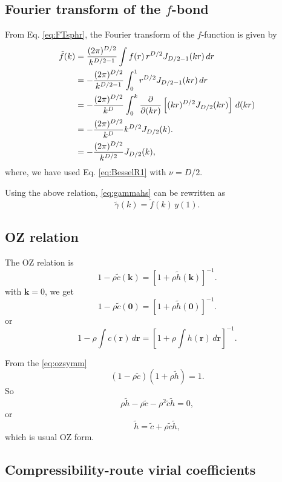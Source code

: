 \documentclass[preprint]{revtex4-1}
\numberwithin{equation}{subsection}
\numberwithin{table}{section}
\newcommand{\vct}[1]{\mathbf{#1}}
\providecommand{\vr}{} %
\renewcommand{\vr}{\vct{r}}
\newcommand{\vk}{\vct{k}}
\begin{document}
\subsection{Fourier transform of the $f$-bond}

From Eq. \eqref{eq:FTsphr},
the Fourier transform of the $f$-function is given by
\begin{align}
  \tilde{f}(k)
&=
\frac{(2\pi)^{D/2}}{k^{D/2-1}}
\int f(r) \, r^{D/2} J_{D/2-1}(kr) \, dr
\notag \\
&=
-\frac{(2\pi)^{D/2}}{k^{D/2-1}}
\int_0^1 r^{D/2} J_{D/2-1}(kr) \, dr
\notag \\
&=
-\frac{(2\pi)^{D/2}}{k^{D}}
\int_0^k \frac{\partial}{\partial (kr)}
\left[(kr)^{D/2} J_{D/2}(kr) \right] \, d(kr)
\notag \\
&=
-\frac{(2\pi)^{D/2}}{k^{D}}
k^{D/2} J_{D/2}(k).
\notag \\
&=
-\frac{(2\pi)^{D/2}}{k^{D/2}} J_{D/2}(k),
\end{align}
where, we have used Eq. \eqref{eq:BesselR1}
with $\nu = D/2$.


Using the above relation, \eqref{eq:gammahs}
can be rewritten as
\[
  \tilde{\gamma}(k) = \tilde{f}(k) \, y(1).
\]




\subsection{OZ relation}

The OZ relation is
\begin{equation}
  1 - \rho \tilde c(\vk)
=
 [1 + \rho \tilde h(\vk)]^{-1}.
 \label{eq:ozsymm}
\end{equation}
%
with $\vk = 0$, we get
\[
  1 - \rho \tilde c(\vct 0)
=
 [1 + \rho \tilde h(\vct 0)]^{-1}.
\]
or
\begin{equation}
  1 - \rho \int c(\vr) \, d\vr
=
 \left[1 + \rho \int h(\vr) \, d\vr \right]^{-1}.
 \label{eq:ozr}
\end{equation}


From the \eqref{eq:ozsymm}
\[
  (1 - \rho \tilde{c}) (1 + \rho \tilde{h}) = 1.
\]
So
\[
  \rho \tilde{h} - \rho \tilde{c} - \rho^2 \tilde{c} \tilde{h} = 0,
\]
or
\[
   \tilde{h} = \tilde{c} + \rho \tilde{c} \tilde{h},
\]
which is usual OZ form.



\subsection{Compressibility-route virial coefficients}
\end{document}
